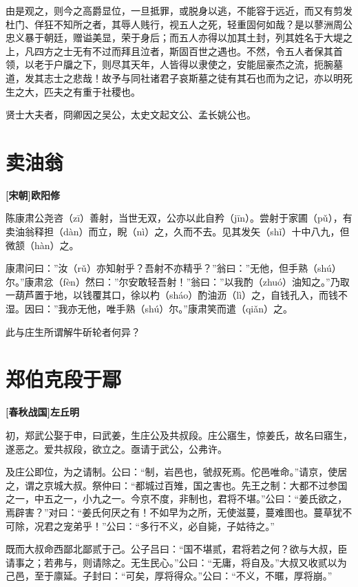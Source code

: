 \documentclass[UTF8,titlepage,oneside]{ctexbook}
\begin{document}
由是观之，则今之高爵显位，一旦抵罪，或脱身以逃，不能容于远近，而又有剪发杜门、佯狂不知所之者，其辱人贱行，视五人之死，轻重固何如哉？是以蓼洲周公忠义暴于朝廷，赠谥美显，荣于身后；而五人亦得以加其土封，列其姓名于大堤之上，凡四方之士无有不过而拜且泣者，斯固百世之遇也。不然，令五人者保其首领，以老于户牖之下，则尽其天年，人皆得以隶使之，安能屈豪杰之流，扼腕墓道，发其志士之悲哉！故予与同社诸君子哀斯墓之徒有其石也而为之记，亦以明死生之大，匹夫之有重于社稷也。


贤士大夫者，冏卿因之吴公，太史文起文公、孟长姚公也。



\chapter*{卖油翁}
\begin{center}
	\textbf{[宋朝]欧阳修}
\end{center}

陈康肃公尧咨（zī）善射，当世无双，公亦以此自矜（jīn）。尝射于家圃（pǔ），有卖油翁释担（dàn）而立，睨（nì）之，久而不去。见其发矢（shǐ）十中八九，但微颔（hàn）之。

康肃问曰：”汝（rǔ）亦知射乎？吾射不亦精乎？”翁曰：”无他，但手熟（shú）尔。”康肃忿（fèn）然曰：”尔安敢轻吾射！”翁曰：”以我酌（zhuó）油知之。”乃取一葫芦置于地，以钱覆其口，徐以杓（sháo）酌油沥（lì）之，自钱孔入，而钱不湿。因曰：”我亦无他，唯手熟（shú）尔。”康肃笑而遣（qiǎn）之。

此与庄生所谓解牛斫轮者何异？


\chapter*{郑伯克段于鄢}
\begin{center}
	\textbf{[春秋战国]左丘明}
\end{center}

初，郑武公娶于申，曰武姜，生庄公及共叔段。庄公寤生，惊姜氏，故名曰寤生，遂恶之。爱共叔段，欲立之。亟请于武公，公弗许。

及庄公即位，为之请制。公曰：“制，岩邑也，虢叔死焉。佗邑唯命。”请京，使居之，谓之京城大叔。祭仲曰：“都城过百雉，国之害也。先王之制：大都不过参国之一，中五之一，小九之一。今京不度，非制也，君将不堪。”公曰：“姜氏欲之，焉辟害？”对曰：“姜氏何厌之有！不如早为之所，无使滋蔓，蔓难图也。蔓草犹不可除，况君之宠弟乎！”公曰：“多行不义，必自毙，子姑待之。”

既而大叔命西鄙北鄙贰于己。公子吕曰：“国不堪贰，君将若之何？欲与大叔，臣请事之；若弗与，则请除之。无生民心。”公曰：“无庸，将自及。”大叔又收贰以为己邑，至于廪延。子封曰：“可矣，厚将得众。”公曰：“不义，不暱，厚将崩。”
\end{document}
